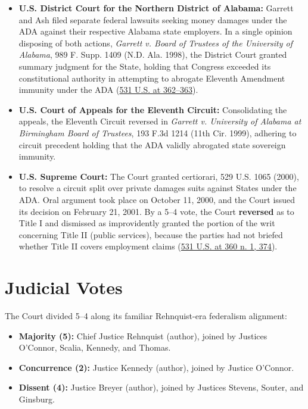 \documentclass[12pt]{article}
\begin{document}
\begin{itemize}
\item \textbf{U.S. District Court for the Northern District of Alabama:} Garrett and Ash filed separate federal lawsuits seeking money damages under the ADA against their respective Alabama state employers. In a single opinion disposing of both actions, \textit{Garrett v. Board of Trustees of the University of Alabama}, 989 F. Supp. 1409 (N.D. Ala. 1998), the District Court granted summary judgment for the State, holding that Congress exceeded its constitutional authority in attempting to abrogate Eleventh Amendment immunity under the ADA (\href{https://supreme.justia.com/cases/federal/us/531/356/}{531 U.S. at 362--363}).
\item \textbf{U.S. Court of Appeals for the Eleventh Circuit:} Consolidating the appeals, the Eleventh Circuit reversed in \textit{Garrett v. University of Alabama at Birmingham Board of Trustees}, 193 F.3d 1214 (11th Cir. 1999), adhering to circuit precedent holding that the ADA validly abrogated state sovereign immunity.
\item \textbf{U.S. Supreme Court:} The Court granted certiorari, 529 U.S. 1065 (2000), to resolve a circuit split over private damages suits against States under the ADA. Oral argument took place on October 11, 2000, and the Court issued its decision on February 21, 2001. By a 5--4 vote, the Court \textbf{reversed} as to Title I and dismissed as improvidently granted the portion of the writ concerning Title II (public services), because the parties had not briefed whether Title II covers employment claims (\href{https://www.law.cornell.edu/supremecourt/text/531/356}{531 U.S. at 360 n. 1, 374}).
\end{itemize}

\section{Judicial Votes}

The Court divided 5--4 along its familiar Rehnquist-era federalism alignment:

\begin{itemize}
\item \textbf{Majority (5):} Chief Justice Rehnquist (author), joined by Justices O'Connor, Scalia, Kennedy, and Thomas.
\item \textbf{Concurrence (2):} Justice Kennedy (author), joined by Justice O'Connor.
\item \textbf{Dissent (4):} Justice Breyer (author), joined by Justices Stevens, Souter, and Ginsburg.
\end{itemize}
\end{document}
